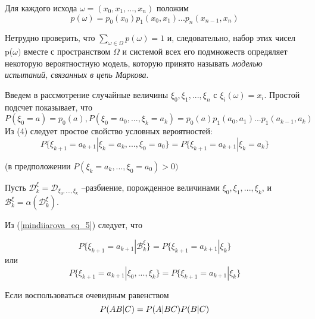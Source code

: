 Для каждого исхода $\omega = (x_0, x_1, ..., x_n)$ положим
\begin{equation} \label{mindiiarova_eq_3} 
p(\omega) = p_0 (x_0) p_1 (x_0, x_1)...p_n (x_{n-1}, x_n)
\end{equation}

Нетрудно проверить, что $\sum\limits_{\omega \in \Omega} p(\omega) = 1$ и,
следовательно, набор этих чисел p($\omega)$ вместе с пространством $\Omega$ и системой всех его подмножеств опредяляет некоторую вероятностную модель, которую принято называть \textit{моделью испытаний, связанных в цепь Маркова}.


Введем в рассмотрение случайные величины $\xi_0, \xi_1, ...,\xi_n$ с 
    $\xi_i(\omega)=x_i$. Простой подсчет показывает, что
\begin{equation} \label{mindiiarova_eq_4} 
P(\xi_0 = a) = p_0(a), P(\xi_0 = a_0, ..., \xi_k = a_k ) = p_0(a) p_1(a_0, a_1)...p_1(a_{k-1}, a_k)
\end{equation}
Из (4) следует простое свойство условных вероятностей:
\begin{equation} \label{mindiiarova_eq_5} 
P \{ \xi_{k+1} = a_{k+1} | \xi_{k} = a_{k}, ..., \xi_{0} = a_{0} \} = P \{ \xi_{k+1} = a_{k+1} | \xi_{k} = a_{k}\}
\end{equation}

\begin{center}
(в предположении  $ P (\xi_k = a_k, ..., \xi_0 = a_0) > 0)$
\end{center}

Пусть $\mathscr{D}^\xi_k = \mathscr{D}_{\xi_0, ..., \xi_k} $ --разбиение, порожденное величинами  $ \xi_0, \xi_1, ...,\xi_k$, и $\mathscr{B}^\xi_k=\alpha(\mathscr{D}^\xi_k) $.


Из (\ref{mindiiarova_eq_5}) следует, что

\begin{equation} \label{mindiiarova_eq_6} 
P \{ \xi_{k+1} = a_{k+1} | \mathscr{B}^{\xi}_k \} = P \{ \xi_{k+1} = a_{k+1} | \xi_k\}
\end{equation}
или
\begin{equation} \label{mindiiarova_eq_7} 
P \{ \xi_{k+1} = a_{k+1} |\xi_0, ...,\xi_k \} = P \{ \xi_{k+1} = a_{k+1} | \xi_k\}
\end{equation}

Если воспользоваться очевидным равенством
\begin{equation} \label{mindiiarova_eq_8} 
P \text(AB|C) = P \text(A|BC) P \text(B|C)
\end{equation}

